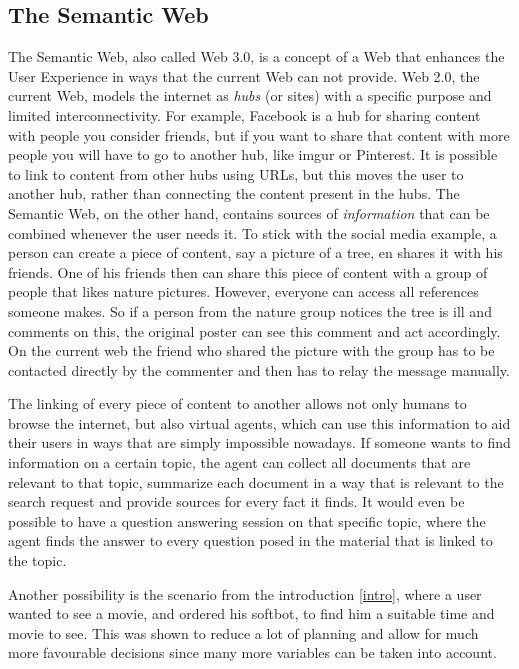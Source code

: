 \documentclass{article}
\begin{document}
 \subsection{The Semantic Web}
 The Semantic Web, also called Web 3.0, is a concept of a Web that enhances the User Experience in ways that the current Web can not provide. Web 2.0, the current Web, models the internet as \textit{hubs} (or sites) with a specific purpose and limited interconnectivity. For example, Facebook is a hub for sharing content with people you consider friends, but if you want to share that content with more people you will have to go to another hub, like imgur or Pinterest. It is possible to link to content from other hubs using URLs, but this moves the user to another hub, rather than connecting the content present in the hubs.
The Semantic Web, on the other hand, contains sources of \textit{information} that can be combined whenever the user needs it. To stick with the social media example, a person can create a piece of content, say a picture of a tree, en shares it with his friends. One of his friends then can share this piece of content with a group of people that likes nature pictures. However, everyone can access all references someone makes. So if a person from the nature group notices the tree is ill and comments on this, the original poster can see this comment and act accordingly. On the current web the friend who shared the picture with the group has to be contacted directly by the commenter and then has to relay the message manually.

 The linking of every piece of content to another allows not only humans to browse the internet, but also virtual agents, which can use this information to aid their users in ways that are simply impossible nowadays. If someone wants to find information on a certain topic, the agent can collect all documents that are relevant to that topic, summarize each document in a way that is relevant to the search request and provide sources for every fact it finds. It would even be possible to have a question answering session on that specific topic, where the agent finds the answer to every question posed in the material that is linked to the topic.

 Another possibility is the scenario from the introduction \ref{intro}, where a user wanted to see a movie, and ordered his softbot, to find him a suitable time and movie to see. This was shown to reduce a lot of planning and allow for much more favourable decisions since many more variables can be taken into account.
\end{document}
